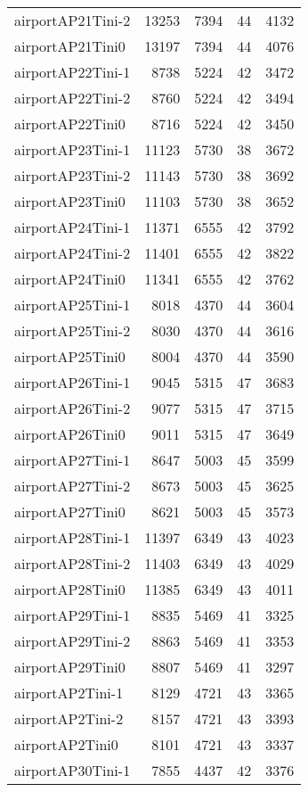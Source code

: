 \begin{longtable}{lrrrr}
airportAP21Tini-2 & 13253 & 7394 & 44 & 4132 \\
airportAP21Tini0 & 13197 & 7394 & 44 & 4076 \\
airportAP22Tini-1 & 8738 & 5224 & 42 & 3472 \\
airportAP22Tini-2 & 8760 & 5224 & 42 & 3494 \\
airportAP22Tini0 & 8716 & 5224 & 42 & 3450 \\
airportAP23Tini-1 & 11123 & 5730 & 38 & 3672 \\
airportAP23Tini-2 & 11143 & 5730 & 38 & 3692 \\
airportAP23Tini0 & 11103 & 5730 & 38 & 3652 \\
airportAP24Tini-1 & 11371 & 6555 & 42 & 3792 \\
airportAP24Tini-2 & 11401 & 6555 & 42 & 3822 \\
airportAP24Tini0 & 11341 & 6555 & 42 & 3762 \\
airportAP25Tini-1 & 8018 & 4370 & 44 & 3604 \\
airportAP25Tini-2 & 8030 & 4370 & 44 & 3616 \\
airportAP25Tini0 & 8004 & 4370 & 44 & 3590 \\
airportAP26Tini-1 & 9045 & 5315 & 47 & 3683 \\
airportAP26Tini-2 & 9077 & 5315 & 47 & 3715 \\
airportAP26Tini0 & 9011 & 5315 & 47 & 3649 \\
airportAP27Tini-1 & 8647 & 5003 & 45 & 3599 \\
airportAP27Tini-2 & 8673 & 5003 & 45 & 3625 \\
airportAP27Tini0 & 8621 & 5003 & 45 & 3573 \\
airportAP28Tini-1 & 11397 & 6349 & 43 & 4023 \\
airportAP28Tini-2 & 11403 & 6349 & 43 & 4029 \\
airportAP28Tini0 & 11385 & 6349 & 43 & 4011 \\
airportAP29Tini-1 & 8835 & 5469 & 41 & 3325 \\
airportAP29Tini-2 & 8863 & 5469 & 41 & 3353 \\
airportAP29Tini0 & 8807 & 5469 & 41 & 3297 \\
airportAP2Tini-1 & 8129 & 4721 & 43 & 3365 \\
airportAP2Tini-2 & 8157 & 4721 & 43 & 3393 \\
airportAP2Tini0 & 8101 & 4721 & 43 & 3337 \\
airportAP30Tini-1 & 7855 & 4437 & 42 & 3376 \\

\end{longtable}

